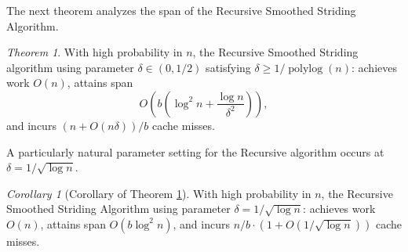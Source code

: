 \documentclass[twocolumn,10pt]{article}
\newcommand{\polylog}{\operatorname{polylog}}
\theoremstyle{remark}
\newtheorem{theorem}{Theorem}[section]
\newtheorem{corollary}[thm]{Corollary}
\theoremstyle{remark}
\begin{document}

The next theorem analyzes the span of the Recursive Smoothed Striding Algorithm.
\begin{theorem}
	\label{thm:groupedPartitionAlg}
	With high probability in $n$, the Recursive Smoothed Striding
        algorithm using parameter $\delta \in(0,1/2)$ satisfying
        $\delta \ge 1 / \polylog(n)$: achieves work $O(n)$, attains span
	$$O\left(b\left(\log^2 n + \frac{\log n}{\delta^2}\right)\right),$$
	and incurs $(n+O(n \delta))/b$ cache misses. 
\end{theorem}

A particularly natural parameter setting for the Recursive algorithm occurs at $\delta = 1 / \sqrt{\log n}$.
\begin{corollary}[Corollary of Theorem \ref{thm:groupedPartitionAlg}]
  \label{cor:groupedPartitionAlg}
	With high probability in $n$, the Recursive Smoothed Striding Algorithm using parameter $\delta=1/\sqrt{\log n}$:
  achieves work $O(n)$, attains span $O(b\log^2 n)$, and incurs $n/b \cdot (1 + O(1 / \sqrt{\log n}))$ cache misses. 
\end{corollary}
\end{document}
